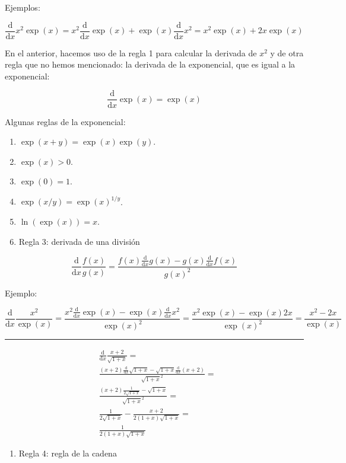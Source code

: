 \documentclass[11pt]{article}
\providecommand{\tightlist}{%
      \setlength{\itemsep}{0pt}\setlength{\parskip}{0pt}}
\begin{document}
Ejemplos:

\[\frac{\text{d}}{\text{d}x} x^2 \exp(x) = x^2 \frac{\text{d}}{\text{d}x} \exp(x) + \exp(x) \frac{\text{d}}{\text{d}x} x^2 = x^2 \exp(x) + 2x \exp(x)\]

En el anterior, hacemos uso de la regla 1 para calcular la derivada de
\(x^2\) y de otra regla que no hemos mencionado: la derivada de la
exponencial, que es igual a la exponencial:

\[\frac{\text{d}}{\text{d}x} \exp(x) = \exp(x)\]

Algunas reglas de la exponencial:

\begin{enumerate}
\def\labelenumi{\arabic{enumi}.}
\item
  \(\exp(x+y) = \exp(x)\exp(y)\).
\item
  \(\exp(x) > 0\).
\item
  \(\exp(0) = 1\).
\item
  \(\exp(x/y) = \exp(x)^{1/y}\).
\item
  \(\ln(\exp(x)) = x\).
\item
  Regla 3: derivada de una división
\end{enumerate}

\[\frac{\text{d}}{\text{d}x} \frac{f(x)}{g(x)} = \frac{f(x) \frac{\text{d}}{\text{d}x} g(x) - g(x) \frac{\text{d}}{\text{d}x} f(x)}{g(x)^2}\]

Ejemplo:

\[\frac{\text{d}}{\text{d}x} \frac{x^2}{\exp(x)} = \frac{x^2 \frac{\text{d}}{\text{d}x} \exp(x) - \exp(x) \frac{\text{d}}{\text{d}x} x^2}{\exp(x)^2} = \frac{x^2 \exp(x) - \exp(x) 2x}{\exp(x)^2} = \frac{x^2 - 2x}{\exp(x)}\]

\begin{center}\rule{0.5\linewidth}{0.5pt}\end{center}

\begin{align*}
  &\frac{\text{d}}{\text{d}x} \frac{x+2}{\sqrt{1+x}} =\\
  &\frac{(x+2) \frac{\text{d}}{\text{d}x} \sqrt{1+x} - \sqrt{1+x} \frac{\text{d}}{\text{d}x} (x+2)}{\sqrt{1+x}^2}= \\
  &\frac{(x+2) \frac{1}{2\sqrt{1+x}} - \sqrt{1+x}}{\sqrt{1+x}^2} =\\
  &\frac{1}{2\sqrt{1+x}} - \frac{x+2}{2(1+x)\sqrt{1+x}} =\\ 
  &\frac{1}{2(1+x)\sqrt{1+x}}
\end{align*}

\begin{enumerate}
\def\labelenumi{\arabic{enumi}.}
\setcounter{enumi}{3}
\tightlist
\item
  Regla 4: regla de la cadena
\end{enumerate}
\end{document}
